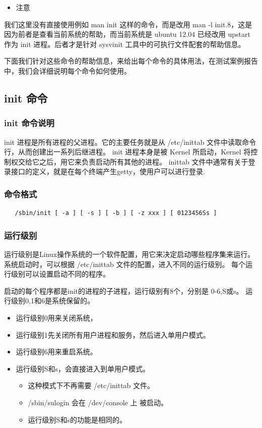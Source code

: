 \begin{itemize}
\item
  注意
\end{itemize}
我们这里没有直接使用例如 man init 这样的命令，而是改用 man -l
init.8，这是因为前者是查看当前系统的帮助，而当前系统是 ubuntu 12.04
已经改用 upstart 作为 init 进程。后者才是针对 sysvinit
工具中的可执行文件配套的帮助信息。

下面我们针对这些命令的帮助信息，来给出每个命令的具体用法，在测试案例报告中，我们会详细说明每个命令如何使用。

\subsection{init 命令}

\subsubsection{init 命令说明}

init 进程是所有进程的父进程。它的主要任务就是从 /etc/inittab
文件中读取命令行，从而创建出一系列后继进程。 init 进程本身是被 Kernel
所启动，Kernel 将控制权交给它之后，用它来负责启动所有其他的进程。 inittab
文件中通常有关于登录接口的定义，就是在每个终端产生getty，使用户可以进行登录.

\subsubsection{命令格式}

{\begin{shaded}\begin{verbatim}
   /sbin/init [ -a ] [ -s ] [ -b ] [ -z xxx ] [ 0123456Ss ]
\end{verbatim}\end{shaded}}
\subsubsection{运行级别}

运行级别是Linux操作系统的一个软件配置，用它来决定启动哪些程序集来运行。
系统启动时，可以根据 /etc/inittab 文件的配置，进入不同的运行级别。
每个运行级别可以设置启动不同的程序。

启动的每个程序都是init的进程的子进程，运行级别有8个，分别是 0-6,S或s。
运行级别0,1和6是系统保留的。

\begin{itemize}
\item
  运行级别0用来关闭系统，
\item
  运行级别1先关闭所有用户进程和服务，然后进入单用户模式。
\item
  运行级别6用来重启系统。
\item
  运行级别S和s，会直接进入到单用户模式。
  \begin{itemize}
  \item
    这种模式下不再需要 /etc/inittab 文件。
  \item
    /sbin/sulogin 会在 /dev/console 上 被启动。
  \item
    运行级别S和s的功能是相同的。
  \end{itemize}
\end{itemize}
